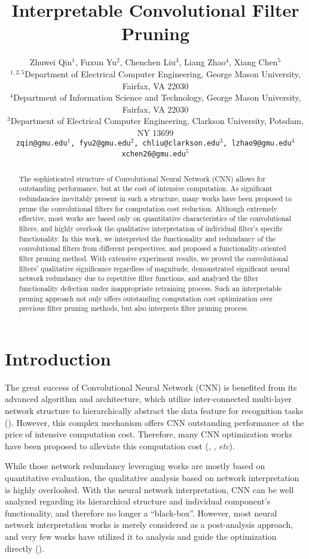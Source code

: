 \documentclass{article} %
\title{Interpretable Convolutional Filter Pruning}
\author{
	Zhuwei Qin$^1$, Fuxun Yu$^2$, Chenchen Liu$^3$, Liang Zhao$^4$, Xiang Chen$^5$ \\
	$^{1,2,5}$Department of Electrical Computer Engineering, George Mason University, Fairfax, VA 22030 \\
	$^{4}$Department of Information Science and Technology, George Mason University, Fairfax, VA 22030 \\
	$^{3}$Department of Electrical Computer Engineering, Clarkson University, Potsdam, NY 13699 \\
	\texttt{zqin@gmu.edu$^1$, fyu2@gmu.edu$^2$, chliu@clarkson.edu$^3$, lzhao9@gmu.edu$^4$}\\
	\texttt{xchen26@gmu.edu$^5$}
}
\begin{document}
\maketitle

\vspace{-3mm}
\begin{abstract}
The sophisticated structure of Convolutional Neural Network (CNN) allows for outstanding performance, but at the cost of intensive computation.
	As significant redundancies inevitably present in such a structure, many works have been proposed to prune the convolutional filters for computation cost reduction.
	Although extremely effective, most works are based only on quantitative characteristics of the convolutional filters, and highly overlook the qualitative interpretation of individual filter's specific functionality.
	In this work, we interpreted the functionality and redundancy of the convolutional filters from different perspectives, and proposed a functionality-oriented filter pruning method.
	With extensive experiment results, we proved the convolutional filters' qualitative significance regardless of magnitude, demonstrated significant neural network redundancy due to repetitive filter functions, and analyzed the filter functionality defection under inappropriate retraining process.
	Such an interpretable pruning approach not only offers outstanding computation cost optimization over previous filter pruning methods, but also interprets filter pruning process.



\end{abstract}
\section{Introduction}
The great success of Convolutional Neural Network (CNN) is benefited from its advanced algorithm and architecture, which utilize inter-connected multi-layer network structure to hierarchically abstract the data feature for recognition tasks (\cite{Kriz:2012:NIPS}).
	However, this complex mechanism offers CNN outstanding performance at the price of intensive computation cost.
	Therefore, many CNN optimization works have been proposed to alleviate this computation cost (\cite{han2015learning}, \cite{jaderberg2014speeding}, \textit{etc}).

While those network redundancy leveraging works are mostly based on quantitative evaluation, the qualitative analysis based on network interpretation is highly overlooked.
	With the neural network interpretation, CNN can be well analyzed regarding its hierarchical structure and individual component's functionality, and therefore no longer a ``black-box''.
	However, most neural network interpretation works is merely considered as a post-analysis approach, and very few works have utilized it to analysis and guide the optimization directly (\cite{Yosinski:2015:ICML:AM}).
\end{document}

